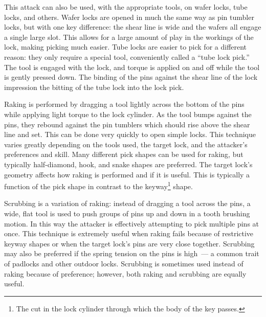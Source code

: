 \documentclass{acm_proc_article-sp}
\begin{document}
This attack can also be used, with the appropriate tools, on wafer locks, tube locks, and others. Wafer locks are opened in much the same way as pin tumbler locks, but with one key difference: the shear line is wide and the wafers all engage a single large slot. This allows for a large amount of play in the workings of the lock, making picking much easier. Tube locks are easier to pick for a different reason: they only require a special tool, conveniently called a ``tube lock pick.'' The tool is engaged with the lock, and torque is applied on and off while the tool is gently pressed down. The binding of the pins against the shear line of the lock impression the bitting of the tube lock into the lock pick.

Raking is performed by dragging a tool lightly across the bottom of the pins while applying light torque to the lock cylinder. As the tool bumps against the pins, they rebound against the pin tumblers which should rise above the shear line and set. This can be done very quickly to open simple locks. This technique varies greatly depending on the tools used, the target lock, and the attacker's preferences and skill. Many different pick shapes can be used for raking, but typically half-diamond, hook, and snake shapes are preferred. The target lock's geometry affects how raking is performed and if it is useful. This is typically a function of the pick shape in contrast to the keyway\footnote{The cut in the lock cylinder through which the body of the key passes.} shape.

Scrubbing is a variation of raking: instead of dragging a tool across the pins, a wide, flat tool is used to push groups of pins up and down in a tooth brushing motion. In this way the attacker is effectively attempting to pick multiple pins at once. This technique is extremely useful when raking fails because of restrictive keyway shapes or when the target lock's pins are very close together. Scrubbing may also be preferred if the spring tension on the pins is high~--- a common trait of padlocks and other outdoor locks. Scrubbing is sometimes used instead of raking because of preference; however, both raking and scrubbing are equally useful.
\end{document}
